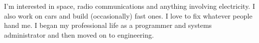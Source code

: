 

\begin{cvparagraph}

I'm interested in space, radio communications and anything involving electricity.  I also work on cars and build (occasionally) fast ones.  I love to fix whatever people hand me.  I began my professional life as a programmer and systems administrator and then moved on to engineering.
\end{cvparagraph}
